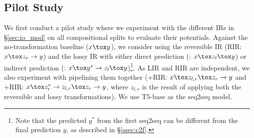 \subsection{Pilot Study}

We first conduct a pilot study where we experiment with the different IRs in \S\ref{sec:io_mod} on all compositional splits to evaluate their potentials.
Against the no-transformation baseline ($x \tox y$),
we consider using the
reversible IR (RIR: $x \tox z_r \to y$) and the
lossy IR with either direct prediction (\LIRdir: $x \tox z_l \tox y$) or indirect prediction (\LIRind: $x \tox y^* \to z_l \tox y$)\footnote{Note that the predicted $y^*$ from the first seq2seq can be different from the final prediction $y$, as described in \S\ref{ssec:c2f}.}.
As LIR and RIR are independent, we also experiment with pipelining them together (\LIRdir+RIR: $x \tox z_{l,r} \tox z_r \to y$ and \LIRind+RIR: $x \tox z^*_r \to z_{l,r} \tox z_r \to y$, where $z_{l,r}$ is the result of applying both the reversible and lossy transformations).
We use T5-base as the seq2seq model.

\begin{table*}[t]
\centering
{}
\caption{Results on the test set for all approaches and all compositional splits with T5-base.}
\label{tab:results_explore}
\end{table*}

